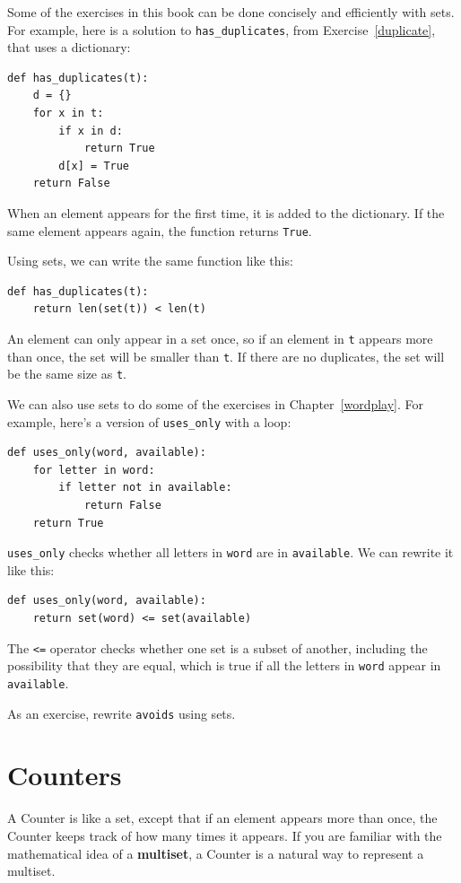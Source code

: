 \documentclass[10pt]{book}
\begin{document}
Some of the exercises in this book can be done concisely and
efficiently with sets.  For example, here is a solution to
\verb"has_duplicates", from
Exercise~\ref{duplicate}, that uses a dictionary:

\begin{verbatim}
def has_duplicates(t):
    d = {}
    for x in t:
        if x in d:
            return True
        d[x] = True
    return False
\end{verbatim}

When an element appears for the first time, it is added to the
dictionary.  If the same element appears again, the function returns
{\tt True}.

Using sets, we can write the same function like this:

\begin{verbatim}
def has_duplicates(t):
    return len(set(t)) < len(t)
\end{verbatim}
%
An element can only appear in a set once, so if an element in {\tt t}
appears more than once, the set will be smaller than {\tt t}.  If there
are no duplicates, the set will be the same size as {\tt t}.

We can also use sets to do some of the exercises in
Chapter~\ref{wordplay}.  For example, here's a version of
\verb"uses_only" with a loop:

\begin{verbatim}
def uses_only(word, available):
    for letter in word:
        if letter not in available:
            return False
    return True
\end{verbatim}
%
\verb"uses_only" checks whether all letters in {\tt word} are
in {\tt available}.  We can rewrite it like this:

\begin{verbatim}
def uses_only(word, available):
    return set(word) <= set(available)
\end{verbatim}
%
The \verb"<=" operator checks whether one set is a subset of another,
including the possibility that they are equal, which is true if all
the letters in {\tt word} appear in {\tt available}.

As an exercise, rewrite \verb"avoids" using sets.


\section{Counters}

A Counter is like a set, except that if an element appears more
than once, the Counter keeps track of how many times it appears.
If you are familiar with the mathematical idea of a {\bf multiset},
a Counter is a natural way to represent a multiset.
\end{document}
